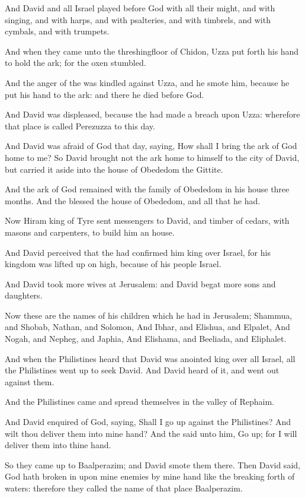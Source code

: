 \Verse And David and all Israel played before God with all their might, and with singing, and with harps, and with psalteries, and with timbrels, and with cymbals, and with trumpets.

\Verse And when they came unto the threshingfloor of Chidon, Uzza put forth his hand to hold the ark; for the oxen stumbled.

\Verse And the anger of the \LORD was kindled against Uzza, and he smote him, because he put his hand to the ark: and there he died before God.

\Verse And David was displeased, because the \LORD had made a breach upon Uzza: wherefore that place is called Perezuzza to this day.

\Verse And David was afraid of God that day, saying, How shall I bring the ark of God home to me?  \Verse So David brought not the ark home to himself to the city of David, but carried it aside into the house of Obededom the Gittite.

\Verse And the ark of God remained with the family of Obededom in his house three months. And the \LORD blessed the house of Obededom, and all that he had.


\Chapter
\Verse Now Hiram king of Tyre sent messengers to David, and timber of cedars, with masons and carpenters, to build him an house.

\Verse And David perceived that the \LORD had confirmed him king over Israel, for his kingdom was lifted up on high, because of his people Israel.

\Verse And David took more wives at Jerusalem: and David begat more sons and daughters.

\Verse Now these are the names of his children which he had in Jerusalem; Shammua, and Shobab, Nathan, and Solomon, \Verse And Ibhar, and Elishua, and Elpalet, \Verse And Nogah, and Nepheg, and Japhia, \Verse And Elishama, and Beeliada, and Eliphalet.

\Verse And when the Philistines heard that David was anointed king over all Israel, all the Philistines went up to seek David. And David heard of it, and went out against them.

\Verse And the Philistines came and spread themselves in the valley of Rephaim.

\Verse And David enquired of God, saying, Shall I go up against the Philistines? And wilt thou deliver them into mine hand? And the \LORD said unto him, Go up; for I will deliver them into thine hand.

\Verse So they came up to Baalperazim; and David smote them there. Then David said, God hath broken in upon mine enemies by mine hand like the breaking forth of waters: therefore they called the name of that place Baalperazim.

